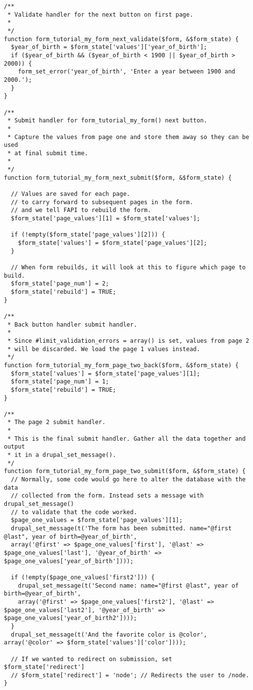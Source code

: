 \documentclass[11pt]{article}
\begin{document}
\begin{verbatim}
/**
 * Validate handler for the next button on first page.
 *
 */
function form_tutorial_my_form_next_validate($form, &$form_state) {
  $year_of_birth = $form_state['values']['year_of_birth'];
  if ($year_of_birth && ($year_of_birth < 1900 || $year_of_birth > 2000)) {
    form_set_error('year_of_birth', 'Enter a year between 1900 and 2000.');
  }
}

/**
 * Submit handler for form_tutorial_my_form() next button.
 *
 * Capture the values from page one and store them away so they can be used
 * at final submit time.
 *
 */
function form_tutorial_my_form_next_submit($form, &$form_state) {

  // Values are saved for each page.
  // to carry forward to subsequent pages in the form.
  // and we tell FAPI to rebuild the form.
  $form_state['page_values'][1] = $form_state['values'];

  if (!empty($form_state['page_values'][2])) {
    $form_state['values'] = $form_state['page_values'][2];
  }

  // When form rebuilds, it will look at this to figure which page to build.
  $form_state['page_num'] = 2;
  $form_state['rebuild'] = TRUE;
}

/**
 * Back button handler submit handler.
 *
 * Since #limit_validation_errors = array() is set, values from page 2
 * will be discarded. We load the page 1 values instead.
 */
function form_tutorial_my_form_page_two_back($form, &$form_state) {
  $form_state['values'] = $form_state['page_values'][1];
  $form_state['page_num'] = 1;
  $form_state['rebuild'] = TRUE;
}

/**
 * The page 2 submit handler.
 *
 * This is the final submit handler. Gather all the data together and output
 * it in a drupal_set_message().
 */
function form_tutorial_my_form_page_two_submit($form, &$form_state) {
  // Normally, some code would go here to alter the database with the data
  // collected from the form. Instead sets a message with drupal_set_message()
  // to validate that the code worked.
  $page_one_values = $form_state['page_values'][1];
  drupal_set_message(t('The form has been submitted. name="@first @last", year of birth=@year_of_birth',
  array('@first' => $page_one_values['first'], '@last' => $page_one_values['last'], '@year_of_birth' => $page_one_values['year_of_birth'])));

  if (!empty($page_one_values['first2'])) {
    drupal_set_message(t('Second name: name="@first @last", year of birth=@year_of_birth',
    array('@first' => $page_one_values['first2'], '@last' => $page_one_values['last2'], '@year_of_birth' => $page_one_values['year_of_birth2'])));
  }
  drupal_set_message(t('And the favorite color is @color', array('@color' => $form_state['values']['color'])));

  // If we wanted to redirect on submission, set $form_state['redirect']
  // $form_state['redirect'] = 'node'; // Redirects the user to /node.
}
\end{verbatim}
\end{document}

